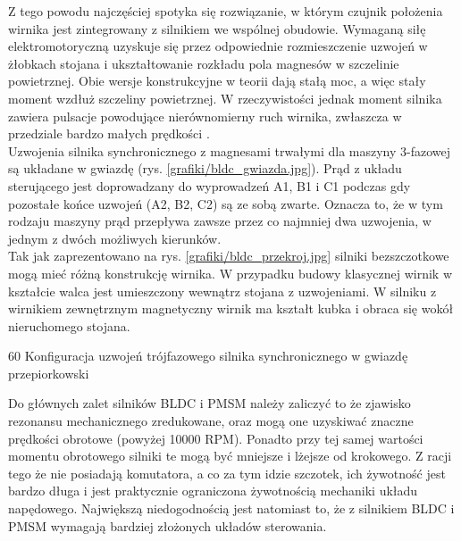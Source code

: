 Z tego powodu najczęściej spotyka się rozwiązanie, w którym czujnik położenia wirnika jest zintegrowany z silnikiem we wspólnej obudowie. Wymaganą siłę elektromotoryczną uzyskuje się przez odpowiednie rozmieszczenie uzwojeń w żłobkach stojana i ukształtowanie rozkładu pola magnesów w szczelinie powietrznej. Obie wersje konstrukcyjne w teorii dają stałą moc, a więc stały moment wzdłuż szczeliny powietrznej. W rzeczywistości jednak moment silnika zawiera pulsacje powodujące nierównomierny ruch wirnika, zwłaszcza w przedziale bardzo małych prędkości \cite{zawirski_pmsm}. \\
		
Uzwojenia silnika synchronicznego z magnesami trwałymi dla maszyny 3-fazowej są układane w gwiazdę (rys. \ref{grafiki/bldc_gwiazda.jpg}). Prąd z układu sterującego jest doprowadzany do wyprowadzeń A1, B1 i C1 podczas gdy pozostałe końce uzwojeń (A2, B2, C2) są ze sobą zwarte. Oznacza to, że w tym rodzaju maszyny prąd przepływa zawsze przez co najmniej dwa uzwojenia, w jednym z dwóch możliwych kierunków. \\
		
Tak jak zaprezentowano na rys. \ref{grafiki/bldc_przekroj.jpg} silniki bezszczotkowe mogą mieć różną konstrukcję wirnika. W przypadku budowy klasycznej wirnik w kształcie walca jest umieszczony wewnątrz stojana z uzwojeniami. W silniku z wirnikiem zewnętrznym magnetyczny wirnik ma kształt kubka i obraca się wokół nieruchomego stojana. 

		{60}
		{Konfiguracja uzwojeń trójfazowego silnika synchronicznego w gwiazdę}
		{przepiorkowski}

Do głównych zalet silników BLDC i PMSM należy zaliczyć to że zjawisko rezonansu mechanicznego zredukowane, oraz mogą one uzyskiwać znaczne prędkości obrotowe (powyżej 10000 RPM). Ponadto przy tej samej wartości momentu obrotowego silniki te mogą być mniejsze i lżejsze od krokowego. Z racji tego że nie posiadają komutatora, a co za tym idzie szczotek, ich żywotność jest bardzo długa i jest praktycznie ograniczona żywotnością mechaniki układu napędowego. Największą niedogodnością jest natomiast to, że z silnikiem BLDC i PMSM wymagają bardziej złożonych układów sterowania.



\clearpage

